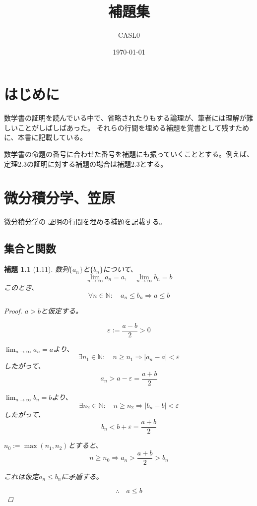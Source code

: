 \documentclass{book}
\title{補題集}
\author{CASL0}
\date{\today}
\newtheorem*{lemma}{補題}
\begin{document}
\maketitle

\frontmatter

\chapter*{はじめに}

数学書の証明を読んでいる中で、省略されたりもする論理が、筆者には理解が難しいことがしばしばあった。
それらの行間を埋める補題を覚書として残すために、本書に記載している。

数学書の命題の番号に合わせた番号を補題にも振っていくこととする。例えば、定理2.3の証明に対する補題の場合は補題2.3とする。

\tableofcontents

\mainmatter

\chapter{微分積分学、笠原}

\href{https://www.saiensu.co.jp/search/?isbn=978-4-7819-0108-4&y=1974}{微分積分学}の
証明の行間を埋める補題を記載する。

\section{集合と関数}

\begin{lemma}[1.11]
  数列$\{a_n\}$と$\{b_n\}$について、
  \[\lim_{n \to \infty} a_n = a, \quad \lim_{n \to \infty} b_n = b\]
  このとき、
  \[\forall n \in \mathbb{N}: \quad a_n \leq b_n \Rightarrow a \leq b\]

  \begin{proof}
    $a > b$と仮定する。

    \[\varepsilon := \dfrac{a-b}{2} > 0\]

    $\lim_{n \to \infty} a_n = a$より、
    \[\exists n_1 \in \mathbb{N}: \quad n \geq n_1 \Rightarrow
    |a_n - a| < \varepsilon\]
    したがって、
    \[a_n > a - \varepsilon = \dfrac{a+b}{2}\]

    $\lim_{n \to \infty} b_n = b$より、
    \[\exists n_2 \in \mathbb{N}: \quad n \geq n_2 \Rightarrow
    |b_n - b| < \varepsilon\]
    したがって、
    \[b_n < b + \varepsilon = \dfrac{a+b}{2}\]

    $n_0 := \max(n_1, n_2)$とすると、
    \[n \geq n_0 \Rightarrow a_n > \dfrac{a+b}{2} > b_n\]

    これは仮定$a_n \leq b_n$に矛盾する。

    \[\therefore \quad a \leq b\]
  \end{proof}
\end{lemma}
\end{document}
